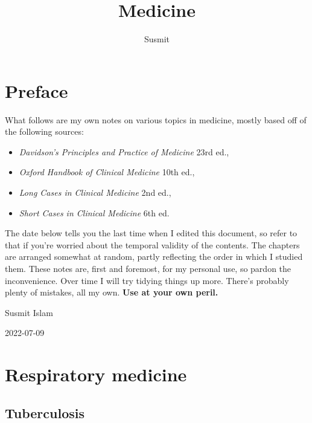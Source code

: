 \documentclass[
  12pt,
]{memoir}
\title{Medicine}
\author{Susmit}
\date{}
\providecommand{\tightlist}{%
  \setlength{\itemsep}{0pt}\setlength{\parskip}{0pt}}
\begin{document}
\frontmatter

\maketitle

\mainmatter
\openany
\raggedbottom
\twocoltocetc
\tableofcontents

\pagebreak

\hypertarget{preface}{%
\chapter*{Preface}\label{preface}}

What follows are my own notes on various topics in medicine, mostly
based off of the following sources:

\begin{itemize}
\tightlist
\item
  \emph{Davidson's Principles and Practice of Medicine} 23rd ed.,
\item
  \emph{Oxford Handbook of Clinical Medicine} 10th ed.,
\item
  \emph{Long Cases in Clinical Medicine} 2nd ed.,
\item
  \emph{Short Cases in Clinical Medicine} 6th ed.
\end{itemize}

The date below tells you the last time when I edited this document, so
refer to that if you're worried about the temporal validity of the
contents. The chapters are arranged somewhat at random, partly
reflecting the order in which I studied them. These notes are, first and
foremost, for my personal use, so pardon the inconvenience. Over time I
will try tidying things up more. There's probably plenty of mistakes,
all my own. \textbf{Use at your own peril.}

\hfill Susmit Islam

\hfill 2022-07-09

\hypertarget{respiratory-medicine}{%
\chapter{Respiratory medicine}\label{respiratory-medicine}}

\hypertarget{tuberculosis}{%
\section{Tuberculosis}\label{tuberculosis}}
\end{document}
